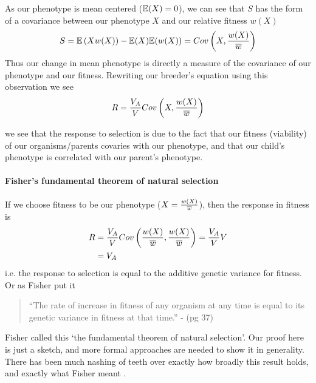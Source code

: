 As our phenotype is mean centered ($\mathbb{E}(X)=0$), we can see that $S$ has
the form of a covariance between our phenotype $X$ and our relative fitness
$w(X)$
\begin{equation}
  S =  \mathbb{E} \left (X
  w(X) \right) -\mathbb{E}(X)\mathbb{E}(w(X)) =Cov \left(X, \frac{w(X)}{\overline{w}} \right) \label{S_covar}
\end{equation}
  Thus our change in mean phenotype is directly a measure of the
covariance of our phenotype and our fitness. Rewriting our breeder's
equation using this observation we see
\begin{equation}
R = \frac{V_A}{V}  Cov \left(X, \frac{w(X)}{\overline{w}} \right)  
\end{equation}

we see that the response to selection is due to the fact that our
fitness (viability) of our organisms/parents covaries with our phenotype, and
that our child's phenotype is correlated with our parent's phenotype. 

\paragraph{Fisher's fundamental theorem of natural selection} 

If we choose fitness to be our phenotype
  ($X=\frac{w(X)}{\overline{w}}$), then the response in fitness is
\begin{align}
  R &= \frac{V_A}{V}  Cov \left(\frac{w(X)}{\overline{w}} ,
  \frac{w(X)}{\overline{w}} \right) = \frac{V_A}{V} V \nonumber\\
  &=V_A
\end{align}
i.e. the response to selection is equal to the additive genetic
variance for fitness. Or as Fisher put it
\begin{quote}
``The rate of increase in fitness of any organism at any time is equal
to its genetic variance in fitness at that time.'' -\citet{fisher1930} (pg 37)
\end{quote}
Fisher called this `the fundamental theorem of natural
selection'. Our proof here is just a sketch, and more formal
approaches are needed to show it in generality. There has been much nashing of teeth over exactly how broadly this result holds, and exactly what
Fisher meant \citep[see ][ for a recent overview]{ewens2010gene}. 
